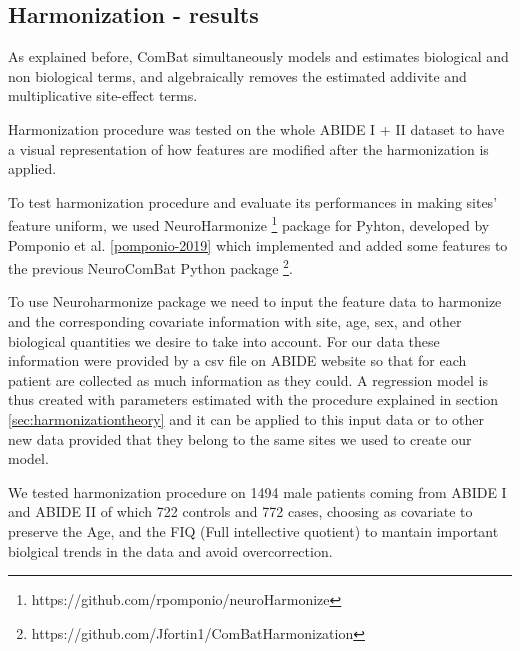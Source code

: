 \documentclass[a4paper,11pt]{article}
\begin{document}



\subsection{Harmonization - results}


As explained before, ComBat simultaneously models and estimates biological and non biological terms, and algebraically removes the estimated addivite and multiplicative site-effect terms.

Harmonization procedure was tested on the whole ABIDE I + II dataset to have a visual representation of how features are modified after the harmonization is applied.

To test harmonization procedure and evaluate its performances in making sites' feature uniform, we used NeuroHarmonize \footnote{https://github.com/rpomponio/neuroHarmonize} package for Pyhton, developed by Pomponio et al. \ref{pomponio-2019} which implemented and added some features to the previous NeuroComBat Python package \footnote{https://github.com/Jfortin1/ComBatHarmonization}.

To use Neuroharmonize package we need to input the feature data to harmonize and the corresponding covariate information with site, age, sex, and other biological quantities we desire to take into account.
For our data these information were provided by a csv file on ABIDE website so that for each patient are collected as much information as they could.
A regression model is thus created with parameters estimated with the procedure explained in section \ref{sec:harmonizationtheory} and it can be applied to this input data or to other new data provided that they belong to the same sites we used to create our model.

We tested harmonization procedure on 1494 male patients coming from ABIDE I and ABIDE II of which 722 controls and 772 cases, choosing as covariate to preserve the Age, and the FIQ (Full intellective quotient) to mantain important biolgical trends in the data and avoid overcorrection.
\end{document}
